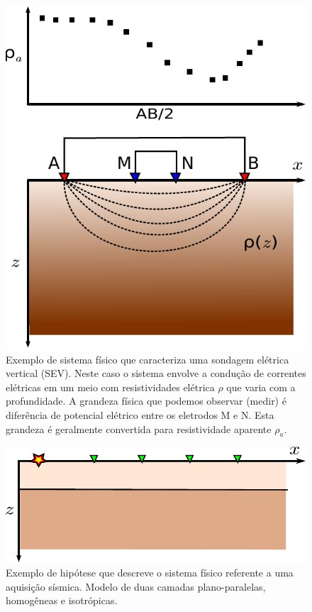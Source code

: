 \begin{figure}
    \centering
    \includegraphics[scale=1]{figs/system-sev}
    \caption{Exemplo de sistema físico que caracteriza uma sondagem elétrica
        vertical (SEV). Neste caso o sistema envolve a condução de correntes
        elétricas em um meio com resistividades elétrica $\rho$ que varia com
        a profundidade.
        A grandeza física que podemos observar (medir) é diferência de potencial
        elétrico entre os eletrodos M e N. Esta grandeza é geralmente convertida
        para resistividade aparente $\rho_a$.}
    \label{fig:system-sev}
\end{figure}

\begin{figure}
    \centering
    \includegraphics[scale=1]{figs/hipotese-seismic}
    \caption{Exemplo de hipótese que descreve o sistema físico referente a uma
    aquisição sísmica. Modelo de duas camadas plano-paralelas, homogêneas e
    isotrópicas.}
    \label{fig:hipotese-seismic}
\end{figure}

